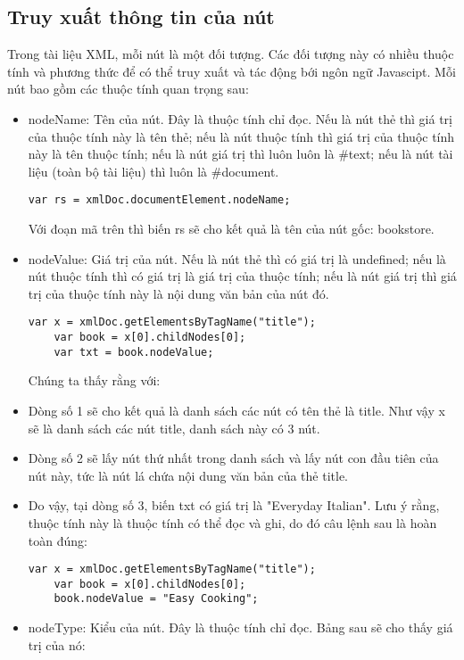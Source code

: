 \subsection{Truy xuất thông tin của nút}
Trong tài liệu XML, mỗi nút là một đối tượng. Các đối tượng này có nhiều thuộc tính và phương thức để có thể truy xuất và tác động bới ngôn ngữ Javascipt. Mỗi nút bao gồm các thuộc tính quan trọng sau: 
\begin{itemize}

\item	{\ttfamily nodeName}: Tên của nút. Đây là thuộc tính chỉ đọc. Nếu là nút thẻ thì giá trị của thuộc tính này là tên thẻ; nếu là nút thuộc tính thì giá trị của thuộc tính này là tên thuộc tính; nếu là nút giá trị thì luôn luôn là \#text; nếu là nút tài liệu (toàn bộ tài liệu) thì luôn là \#document.
\lstset{language=XML}
\begin{lstlisting}[escapechar=`]
	var rs = xmlDoc.documentElement.nodeName;
\end{lstlisting}
Với đoạn mã trên thì biến rs sẽ cho kết quả là tên của nút gốc: bookstore.
\item	{\ttfamily nodeValue}: Giá trị của nút. Nếu là nút thẻ thì có giá trị là undefined; nếu là nút thuộc tính thì có giá trị là giá trị của thuộc tính; nếu là nút giá trị thì giá trị của thuộc tính này là nội dung văn bản của nút đó.
\lstset{language=XML}
\begin{lstlisting}[escapechar=`]
	var x = xmlDoc.getElementsByTagName("title");
	var book = x[0].childNodes[0];
	var txt = book.nodeValue; 
\end{lstlisting}
Chúng ta thấy rằng với:
\item	Dòng số 1 sẽ cho kết quả là danh sách các nút có tên thẻ là title. Như vậy x sẽ là danh sách các nút title, danh sách này có 3 nút. 
\item	Dòng số 2 sẽ lấy nút thứ nhất trong danh sách và lấy nút con đầu tiên của nút này, tức là nút lá chứa nội dung văn bản của thẻ title. 
\item	Do vậy, tại dòng số 3, biến {\ttfamily txt} có giá trị là {\ttfamily "Everyday Italian"}. Lưu ý rằng, thuộc tính này là thuộc tính có thể đọc và ghi, do đó câu lệnh sau là hoàn toàn đúng:
\lstset{language=XML}
\begin{lstlisting}[escapechar=`]
	var x = xmlDoc.getElementsByTagName("title");
	var book = x[0].childNodes[0];
	book.nodeValue = "Easy Cooking";
\end{lstlisting}
\item	{\ttfamily nodeType}: Kiểu của nút. Đây là thuộc tính chỉ đọc. Bảng sau sẽ cho thấy giá trị của nó:
\end{itemize}


